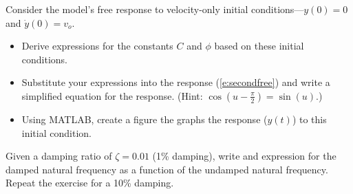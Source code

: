 \begin{ex}
Consider the model's free response to velocity-only initial conditions---$y(0)=0$ and $\dot{y}(0)=v_o$.
\begin{itemize}
\item Derive expressions for the constants $C$ and $\phi$ based on these initial conditions.
\item Substitute your expressions into the response (\ref{e:secondfree}) and write a simplified equation for the response.  (Hint: $\cos\left(u-\frac{\pi}{2}\right) = \sin(u)$.)
\item Using MATLAB, create a figure the graphs the response ($y(t)$) to this initial condition.
\end{itemize}
\end{ex}


\begin{ex}
Given a damping ratio of $\zeta=0.01$ (1\% damping), write and expression for the damped natural frequency as a function of the undamped natural frequency.  \\
Repeat the exercise for a 10\% damping.
\end{ex}

